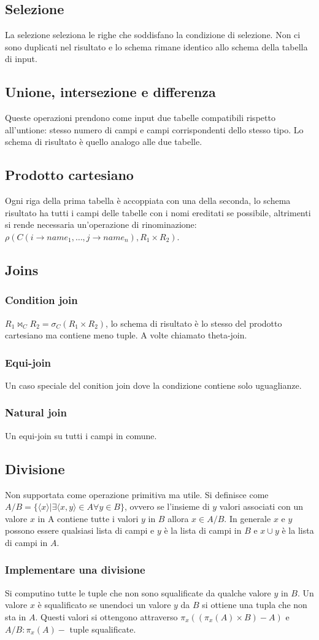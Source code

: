\subsection{Selezione}
La selezione seleziona le righe che soddisfano la condizione di selezione. Non ci sono duplicati nel risultato e lo schema rimane identico allo schema della
tabella di input. 
\subsection{Unione, intersezione e differenza}
Queste operazioni prendono come input due tabelle compatibili rispetto all'untione: stesso numero di campi e campi corrispondenti dello stesso tipo. Lo 
schema di risultato \`e quello analogo alle due tabelle.
\subsection{Prodotto cartesiano}
Ogni riga della prima tabella \`e accoppiata con una della seconda, lo schema risultato ha tutti i campi delle tabelle con i nomi ereditati se possibile, 
altrimenti si rende necessaria un'operazione di rinominazione: $\rho(C(i\rightarrow name_1,\dots,  j\rightarrow name_n), R_1\times R_2)$.
\subsection{Joins}
\subsubsection{Condition join}
$R_1\bowtie_C R_2=\sigma_C(R_1\times R_2)$, lo schema di risultato \`e lo stesso del prodotto cartesiano ma contiene meno tuple. A volte chiamato theta-join.
\subsubsection{Equi-join}
Un caso speciale del conition join dove la condizione contiene solo uguaglianze. 
\subsubsection{Natural join}
Un equi-join su tutti i campi in comune. 
\subsection{Divisione}
Non supportata come operazione primitiva ma utile. Si definisce come $A/B=\{\langle x\rangle|\exists\langle x, y\rangle\in A \forall y\in B\}$, ovvero se 
l'insieme di $y$ valori associati con un valore $x$ in A contiene tutte i valori $y$ in $B$ allora $x\in A/B$. In generale $x$ e $y$ possono essere qualsiasi
lista di campi e $y$ \`e la lista di campi in $B$ e $x\cup y$ \`e la lista di campi in $A$. 
\subsubsection{Implementare una divisione}
Si computino tutte le tuple che non sono squalificate da qualche valore $y$ in $B$. Un valore $x$ \`e squalificato se unendoci un valore $y$ da $B$ si 
ottiene una tupla che non sta in $A$. Questi valori si ottengono attraverso $\pi_x((\pi_x(A)\times B)-A)$ e $A/B:\pi_x(A)-$ tuple squalificate.  